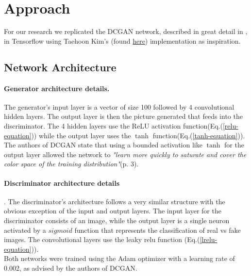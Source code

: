 
\section{Approach}
%
For our research we replicated the DCGAN network, described in great detail in \cite{DBLP:journals/corr/RadfordMC15}, in Tensorflow using Taehoon Kim's (found \href{https://github.com/carpedm20/DCGAN-tensorflow}{here}) implementation as inspiration.
\subsection{Network Architecture}
\paragraph{Generator architecture details.} The generator's input layer is a vector of size 100 followed by 4 convolutional hidden layers. The output layer is then the picture generated that feeds into the discriminator. The 4 hidden layers use the ReLU activation function(Eq.(\ref{relu-equation})) while the output layer uses the $\tanh$ function(Eq.(\ref{tanh-equation})). The authors of DCGAN state that using a bounded activation like $\tanh$ for the output layer allowed the network to \textit{"learn more quickly to saturate and cover the color space of the training distribution"}(p. 3).
\paragraph{Discriminator architecture details}. The discriminator's architecture  follows a very similar structure with the obvious exception of the input and output layers. The input layer for the discriminator consists of an image, while the output layer is a single neuron activated by a $sigmoid$ function that represents the classification of real vs fake images. The convolutional layers use the leaky relu function (Eq.(\ref{lrelu-equation})). \\
Both networks were trained using the Adam optimizer \cite{2014arXiv1412.6980K} with a learning rate of 0.002, as advised by the authors of DCGAN.


